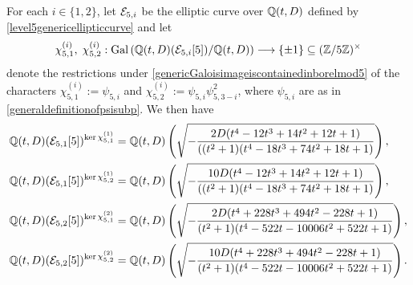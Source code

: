 \begin{lemma} \label{subfieldsoflevel5lemma}
For each $i \in \{1, 2\}$, let $\mathcal{E}_{5,i}$ be the elliptic curve over $\mathbb{Q}(t,D)$ defined by \eqref{level5genericellipticcurve} and let  
\[
\chi_{5,1}^{(i)}, \; \chi_{5,2}^{(i)} : \operatorname{Gal}\left( \mathbb{Q}(t,D)(\mathcal{E}_{5,i}[5])/\mathbb{Q}(t,D) \right) \longrightarrow \{ \pm 1 \} \subseteq (\mathbb{Z}/5\mathbb{Z})^\times
\]
denote the restrictions under \eqref{genericGaloisimageiscontainedinborelmod5} of the characters $\chi_{5,1}^{(i)} := \psi_{5,i}$ and $\chi_{5,2}^{(i)} := \psi_{5,i}\psi_{5,3-i}^2$, where $\psi_{5,i}$ are as in \eqref{generaldefinitionofpsisubp}.  We then have
\begin{equation} \label{subfieldsoflevel5lemmaeqn}
\begin{split}
\mathbb{Q}(t,D)(\mathcal{E}_{5,1}[5])^{\ker \chi_{5,1}^{(1)}} &= \mathbb{Q}(t,D)\left( \sqrt{-\frac{2D(t^4 - 12t^3 + 14t^2 + 12t + 1)}{((t^2 + 1)(t^4 - 18t^3 + 74t^2 + 18t + 1)}} \right), \\
\mathbb{Q}(t,D)(\mathcal{E}_{5,1}[5])^{\ker \chi_{5,2}^{(1)}} &= \mathbb{Q}(t,D)\left( \sqrt{-\frac{10D(t^4 - 12t^3 + 14t^2 + 12t + 1)}{((t^2 + 1)(t^4 - 18t^3 + 74t^2 + 18t + 1)}} \right), \\
\mathbb{Q}(t,D)(\mathcal{E}_{5,2}[5])^{\ker \chi_{5,1}^{(2)}} &= \mathbb{Q}(t,D)\left( \sqrt{-\frac{2D(t^4 + 228t^3 + 494t^2 - 228t + 1)}{(t^2+1)(t^4 - 522t - 10006t^2 + 522t + 1)}} \right), \\
\mathbb{Q}(t,D)(\mathcal{E}_{5,2}[5])^{\ker \chi_{5,2}^{(2)}} &= \mathbb{Q}(t,D)\left( \sqrt{-\frac{10D(t^4 + 228t^3 + 494t^2 - 228t + 1)}{(t^2+1)(t^4 - 522t - 10006t^2 + 522t + 1)}} \right).
\end{split}
\end{equation}
\end{lemma}

